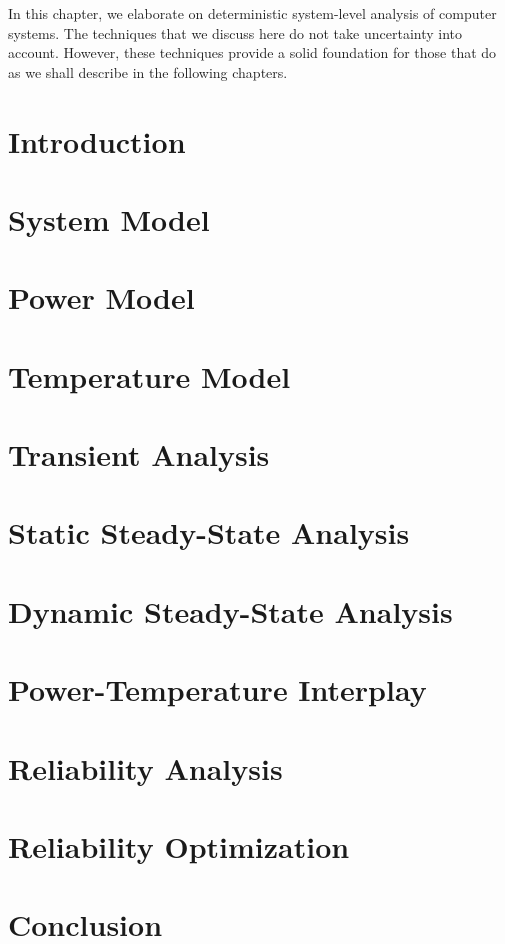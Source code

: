 In this chapter, we elaborate on deterministic system-level analysis of computer
systems. The techniques that we discuss here do not take uncertainty into
account. However, these techniques provide a solid foundation for those that do
as we shall describe in the following chapters.

\section{Introduction}

\section{System Model}

\section{Power Model}

\section{Temperature Model}

\section{Transient Analysis}

\section{Static Steady-State Analysis}

\section{Dynamic Steady-State Analysis}

\section{Power-Temperature Interplay}

\section{Reliability Analysis}

\section{Reliability Optimization}

\section{Conclusion}

